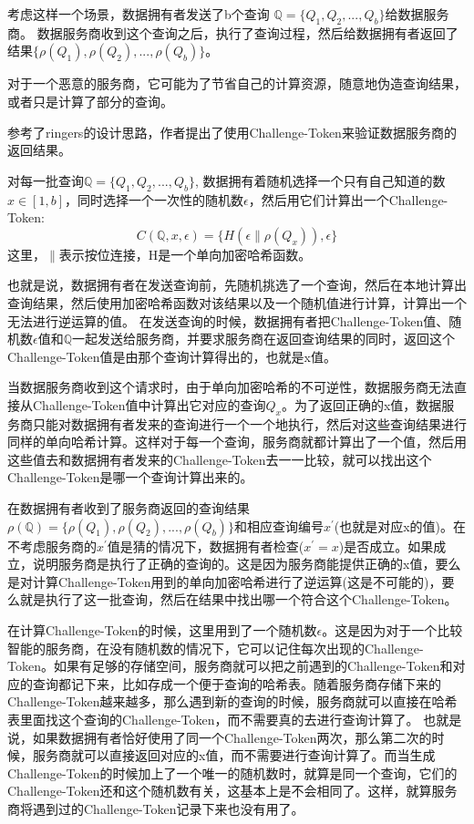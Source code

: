 考虑这样一个场景，数据拥有者发送了b个查询 $\mathbb{Q} = \{Q_1, Q_2, ... ,Q_b\}$给数据服务商。
数据服务商收到这个查询之后，执行了查询过程，然后给数据拥有者返回了结果$\{\rho(Q_1), \rho(Q_2), ..., \rho(Q_b)\}$。

对于一个恶意的服务商，它可能为了节省自己的计算资源，随意地伪造查询结果，或者只是计算了部分的查询。

参考了ringers的设计思路，作者提出了使用Challenge-Token来验证数据服务商的返回结果。

对每一批查询$\mathbb{Q} = \{Q_1, Q_2, ... ,Q_b\}$, 数据拥有着随机选择一个只有自己知道的数 $x \in [1, b]$，同时选择一个一次性的随机数$\epsilon$，然后用它们计算出一个Challenge-Token:
\begin{equation} C(\mathbb{Q}, x, \epsilon) = \{H(\epsilon \parallel \rho(Q_x)), \epsilon\}\end{equation}
这里，$\parallel$表示按位连接，H是一个单向加密哈希函数。

也就是说，数据拥有者在发送查询前，先随机挑选了一个查询，然后在本地计算出查询结果，然后使用加密哈希函数对该结果以及一个随机值进行计算，计算出一个无法进行逆运算的值。
在发送查询的时候，数据拥有者把Challenge-Token值、随机数$\epsilon$值和$\mathbb{Q}$一起发送给服务商，并要求服务商在返回查询结果的同时，返回这个Challenge-Token值是由那个查询计算得出的，也就是x值。

当数据服务商收到这个请求时，由于单向加密哈希的不可逆性，数据服务商无法直接从Challenge-Token值中计算出它对应的查询$Q_x$。为了返回正确的x值，数据服务商只能对数据拥有者发来的查询进行一个一个地执行，然后对这些查询结果进行同样的单向哈希计算。这样对于每一个查询，服务商就都计算出了一个值，然后用这些值去和数据拥有者发来的Challenge-Token去一一比较，就可以找出这个Challenge-Token是哪一个查询计算出来的。

在数据拥有者收到了服务商返回的查询结果$\rho(\mathbb{Q}) = \{\rho(Q_1), \rho(Q_2), ..., \rho(Q_b)\}$和相应查询编号$x^\prime$(也就是对应x的值)。在不考虑服务商的$x^\prime$值是猜的情况下，数据拥有者检查($x^\prime = x$)是否成立。如果成立，说明服务商是执行了正确的查询的。这是因为服务商能提供正确的x值，要么是对计算Challenge-Token用到的单向加密哈希进行了逆运算(这是不可能的)，要么就是执行了这一批查询，然后在结果中找出哪一个符合这个Challenge-Token。

在计算Challenge-Token的时候，这里用到了一个随机数$\epsilon$。这是因为对于一个比较智能的服务商，在没有随机数的情况下，它可以记住每次出现的Challenge-Token。如果有足够的存储空间，服务商就可以把之前遇到的Challenge-Token和对应的查询都记下来，比如存成一个便于查询的哈希表。随着服务商存储下来的Challenge-Token越来越多，那么遇到新的查询的时候，服务商就可以直接在哈希表里面找这个查询的Challenge-Token，而不需要真的去进行查询计算了。
也就是说，如果数据拥有者恰好使用了同一个Challenge-Token两次，那么第二次的时候，服务商就可以直接返回对应的x值，而不需要进行查询计算了。而当生成Challenge-Token的时候加上了一个唯一的随机数时，就算是同一个查询，它们的Challenge-Token还和这个随机数有关，这基本上是不会相同了。这样，就算服务商将遇到过的Challenge-Token记录下来也没有用了。

